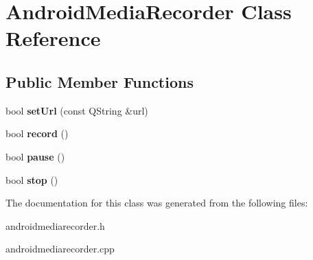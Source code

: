 \hypertarget{classAndroidMediaRecorder}{\section{Android\-Media\-Recorder Class Reference}
\label{classAndroidMediaRecorder}
}
\subsection*{Public Member Functions}
\begin{DoxyCompactItemize}
\item 
\hypertarget{classAndroidMediaRecorder_a2fc274347174763243f5b06e1bd5e180}{bool {\bfseries set\-Url} (const Q\-String \&url)}\label{classAndroidMediaRecorder_a2fc274347174763243f5b06e1bd5e180}

\item 
\hypertarget{classAndroidMediaRecorder_a484a1257b532617beeb3a05c8d57d72c}{bool {\bfseries record} ()}\label{classAndroidMediaRecorder_a484a1257b532617beeb3a05c8d57d72c}

\item 
\hypertarget{classAndroidMediaRecorder_a1f541108d9f51f09b86c896cbbadd5e6}{bool {\bfseries pause} ()}\label{classAndroidMediaRecorder_a1f541108d9f51f09b86c896cbbadd5e6}

\item 
\hypertarget{classAndroidMediaRecorder_a55be1f6d75c806d2ba2e306739909acf}{bool {\bfseries stop} ()}\label{classAndroidMediaRecorder_a55be1f6d75c806d2ba2e306739909acf}

\end{DoxyCompactItemize}


The documentation for this class was generated from the following files\-:\begin{DoxyCompactItemize}
\item 
androidmediarecorder.\-h\item 
androidmediarecorder.\-cpp\end{DoxyCompactItemize}
